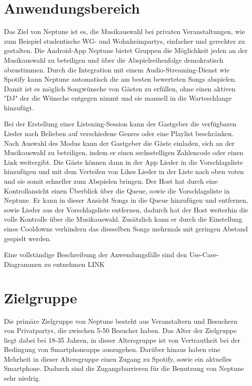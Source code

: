 \documentclass[oneside, ngerman]{sdqtechreport}
\begin{document}
\section{Anwendungsbereich}
\label{sec:Einleitung:Anwendungsbereich}

Das Ziel von Neptune ist es, die Musikauswahl bei privaten Veranstaltungen, wie zum Beispiel studentische WG- und Wohnheimpartys, einfacher und gerechter zu gestalten.
Die Android-App Neptune bietet Gruppen die Möglichkeit jeden an der Musikauswahl zu beteiligen und über die Abspielreihenfolge demokratisch abzustimmen. Durch die Integration mit einem Audio-Streaming-Dienst wie Spotify kann Neptune automatisch die am besten bewerteten Songs abspielen. Damit ist es möglich Songwünsche von Gästen zu erfüllen, ohne einen aktiven "DJ"  der die Wünsche entgegen nimmt und sie manuell in die Warteschlange hinzufügt.

Bei der Erstellung einer Listening-Session kann der Gastgeber die verfügbaren Lieder nach Belieben auf verschiedene Genres oder eine Playlist beschränken. Nach Auswahl des Modus kann der Gastgeber die Gäste einladen, sich an der Musikauswahl zu beteiligen, indem er einen sechsstelligen Zahlencode oder einen Link weitergibt. Die Gäste können dann in der App Lieder in die Vorschlagsliste hinzufügen und mit dem Verteilen von Likes Lieder in der Liste nach oben voten und sie somit schneller zum Abspielen bringen. Der Host hat durch eine Kontrollansicht einen Überblick über die Queue, sowie die Vorschlagsliste in Neptune. Er kann in dieser Ansicht Songs in die Queue hinzufügen und entfernen, sowie Lieder aus der Vorschlagsliste entfernen, dadurch hat der Host weiterhin die volle Kontrolle über die Musikauswahl. Zusätzlich kann er durch die Einstellung
eines Cooldowns verhindern das diesselben Songs mehrmals mit geringen Abstand gespielt werden.

Eine vollständige Beschreibung der Anwendungsfälle sind  den Use-Case-Diagrammen zu entnehmen   LINK


\section{Zielgruppe}
\label{sec:Einleitung:Zielgruppe}

Die primäre Zielgruppe von Neptune besteht aus Veranstaltern und Besuchern von Privatpartys, die zwischen 5-50 Besucher haben. Das Alter der Zielgruppe liegt dabei bei 18-35 Jahren, in dieser Altersgruppe ist von Vertrautheit bei der Bedingung von Smartphoneapps auszugehen. Darüber hinaus haben eine Mehrheit in dieser Altersgruppe einen Zugang zu Spotify, sowie ein aktuelles Smartphone. Dadurch sind die Zugangsbarrieren für die Benutzung von Neptune sehr niedrig.
\end{document}
